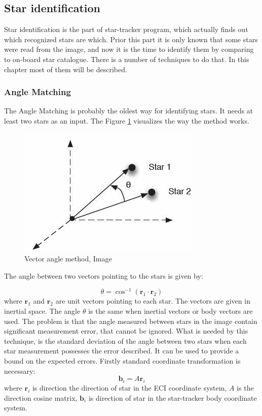 \documentclass[12pt,a4paper,oneside]{article}
\begin{document}
\subsection{Star identification}

Star identification is the part of star-tracker program, which actually finds out which recognized stars are which. Prior this part it is only known that some stars were read from the image, and now it is the time to identify them by comparing to on-board star catalogue. There is a number of techniques to do that\cite{spratling2009survey}. In this chapter most of them will be described.


\subsubsection{Angle Matching}
The Angle Matching is probably the oldest way for identifying stars. It needs at least two stars as an input\cite{gottlieb1978star}. The Figure \ref{fig:angle_matching} visualizes the way the method works.

\begin{figure}[ht]
\includegraphics[scale=0.7]{vector_angle_method.jpg}
\centering
\caption{Vector angle method, Image \citet{gottlieb1978star}}
\label{fig:angle_matching}
\end{figure}

The angle between two vectors pointing to the stars is given by:

\begin{equation}
\theta = \cos^{-1}(\bm{r}_1 \cdot \bm{r}_2)
\end{equation}
where $\bm{r}_1$ and $\bm{r}_2$ are unit vectors pointing to each star. The vectors are given in inertial space. The angle $\theta$ is the same when inertial vectors or body vectors are used. The problem is that the angle measured between stars in the image contain significant measurement error, that cannot be ignored.
What is needed by this technique, is the standard deviation of the angle between two stars when each star measurement possesses the error described. It can be used to provide a bound on the expected errors.
Firstly standard coordinate transformation is necessary:
\begin{equation}
\bm{b}_i = A\bm{r}_i
\end{equation}
where $\bm{r}_i$ is direction the direction of star in the ECI coordinate system, $A$ is the direction cosine matrix, $\bm{b}_i$ is direction of star in the star-tracker body coordinate system.
\end{document}
